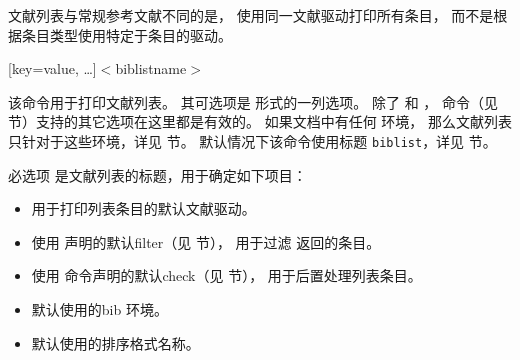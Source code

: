 文献列表与常规参考文献不同的是，
使用同一文献驱动打印所有条目，
而不是根据条目类型使用特定于条目的驱动。

\begin{ltxsyntax}

[key=value, \dots]{$<$biblistname$>$}


该命令用于打印文献列表。
其可选项是 \keyval 形式的一列选项。
除了  和 ，
 命令（见  节）支持的其它选项在这里都是有效的。
如果文档中有任何  环境，
那么文献列表只针对于这些环境，详见  节。
默认情况下该命令使用标题 \texttt{biblist}，详见  节。

必选项  是文献列表的标题，用于确定如下项目：
\begin{itemize}
\item %
用于打印列表条目的默认文献驱动。
\item %
使用  声明的默认filter（见  节），
用于过滤 \biber 返回的条目。
\item %
使用  命令声明的默认check（见  节），
用于后置处理列表条目。
\item %
默认使用的bib 环境。
\item %
默认使用的排序格式名称。
\end{itemize}



\end{ltxsyntax}

